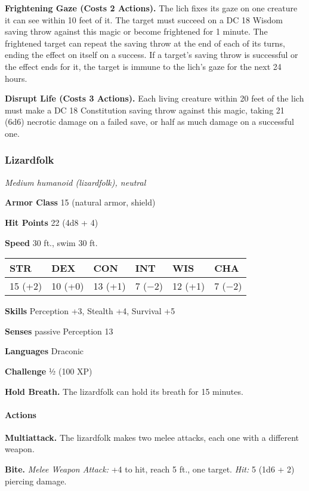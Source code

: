 \documentclass[
]{article}
\begin{document}
\textbf{Frightening Gaze (Costs 2 Actions).} The lich fixes its gaze on
one creature it can see within 10 feet of it. The target must succeed on
a DC 18 Wisdom saving throw against this magic or become frightened for
1 minute. The frightened target can repeat the saving throw at the end
of each of its turns, ending the effect on itself on a success. If a
target's saving throw is successful or the effect ends for it, the
target is immune to the lich's gaze for the next 24 hours.

\textbf{Disrupt Life (Costs 3 Actions).} Each living creature within 20
feet of the lich must make a DC 18 Constitution saving throw against
this magic, taking 21 (6d6) necrotic damage on a failed save, or half as
much damage on a successful one.

\hypertarget{lizardfolk}{%
\subsubsection{Lizardfolk}\label{lizardfolk}}

\emph{Medium humanoid (lizardfolk), neutral}

\textbf{Armor Class} 15 (natural armor, shield)

\textbf{Hit Points} 22 (4d8 + 4)

\textbf{Speed} 30 ft., swim 30 ft.

\begin{longtable}[]{@{}llllll@{}}
\toprule
STR & DEX & CON & INT & WIS & CHA\tabularnewline
\midrule
\endhead
15 (+2) & 10 (+0) & 13 (+1) & 7 (−2) & 12 (+1) & 7 (−2)\tabularnewline
\bottomrule
\end{longtable}

\textbf{Skills} Perception +3, Stealth +4, Survival +5

\textbf{Senses} passive Perception 13

\textbf{Languages} Draconic

\textbf{Challenge} ½ (100 XP)

\textbf{Hold Breath.} The lizardfolk can hold its breath for 15 minutes.

\hypertarget{actions-2}{%
\paragraph{Actions}\label{actions-2}}

\textbf{Multiattack.} The lizardfolk makes two melee attacks, each one
with a different weapon.

\textbf{Bite.} \emph{Melee Weapon Attack:} +4 to hit, reach 5 ft., one
target. \emph{Hit:} 5 (1d6 + 2) piercing damage.
\end{document}
